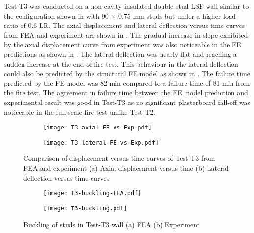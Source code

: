 Test-T3 was conducted on a non-cavity insulated double stud LSF wall similar to the configuration shown in  with 90 $\times$ 0.75 mm studs but under a higher load ratio of 0.6 LR. The axial displacement and lateral deflection versus time curves from FEA and experiment are shown in . The gradual increase in slope exhibited by the axial displacement curve from experiment was also noticeable in the FE predictions as shown in . The lateral deflection was nearly flat and reaching a sudden increase at the end of fire test. This behaviour in the lateral deflection could also be predicted by the structural FE model as shown in . The failure time predicted by the FE model was 82 min compared to a failure time of 81 min from the fire test. The agreement in failure time between the FE model prediction and experimental result was good in Test-T3 as no significant plasterboard fall-off was noticeable in the full-scale fire test unlike Test-T2.
\begin{figure}[!htbp]
	\centering
	\begin{subfigure}[b]{0.7\textwidth}
		\centering
		\texttt{[image: T3-axial-FE-vs-Exp.pdf]}
		\caption{}
		\label{subfig:T3-axial-FE-vs-Exp}
	\end{subfigure}
	\begin{subfigure}[b]{0.7\textwidth}
		\centering
		\texttt{[image: T3-lateral-FE-vs-Exp.pdf]}
		\caption{}
		\label{subfig:T3-lateral-FE-vs-Exp}
	\end{subfigure}
	   \caption{Comparison of displacement versus time curves of Test-T3 from FEA and experiment (a) Axial displacement versus time (b) Lateral deflection versus time curves}
	   \label{fig:T3-structural-FE-vs-Exp}
\end{figure} 
\begin{figure}[!htbp]
	\centering
	\begin{subfigure}[b]{0.8\textwidth}
		\centering
		\texttt{[image: T3-buckling-FEA.pdf]}
		\caption{}
		\label{subfig:T3-buckling-FEA}
	\end{subfigure}
	\begin{subfigure}[b]{0.3\textwidth}
		\centering
		\texttt{[image: T3-buckling.pdf]}
		\caption{}
		\label{subfig:T3-buckling-FEA-Exp}
	\end{subfigure}
	   \caption{Buckling of studs in Test-T3 wall (a) FEA (b) Experiment}
	   \label{fig:T3-buckling-FE-vs-Exp}
\end{figure} 

